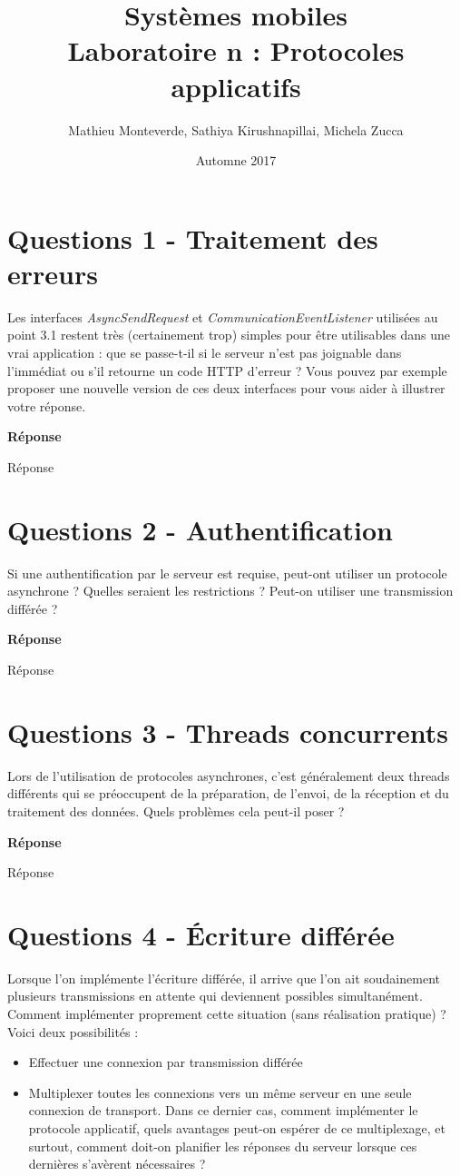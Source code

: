 \documentclass[francais,12pt]{article}
\title{Systèmes mobiles \\ Laboratoire n\textordmasculine2 : Protocoles applicatifs}
\author{Mathieu Monteverde, Sathiya Kirushnapillai, Michela Zucca}
\date{Automne 2017}
\begin{document}
	
	\maketitle
	
	\setlength{\parskip}{1em}
	
	\section*{Questions 1 - Traitement des erreurs}
	
	Les interfaces \textit{AsyncSendRequest} et \textit{CommunicationEventListener} utilisées au point 3.1 restent très (certainement trop) simples pour être utilisables dans une vrai application : que se passe-t-il si le serveur n'est pas joignable dans l'immédiat ou s'il retourne un code HTTP d'erreur ? Vous pouvez par exemple proposer une nouvelle version de ces deux interfaces pour vous aider à illustrer votre réponse.
	
	{\color[rgb]{0,0.5,0.23}\textbf{Réponse}}
	
	Réponse
	
	\section*{Questions 2 - Authentification}
	Si une authentification par le serveur est requise, peut-ont utiliser un protocole asynchrone ? Quelles seraient les restrictions ? Peut-on utiliser une transmission différée ?
	
	
	{\color[rgb]{0,0.5,0.23}\textbf{Réponse}}
	
	Réponse
	
	
	\section*{Questions 3 - Threads concurrents}
	Lors de l'utilisation de protocoles asynchrones, c'est généralement deux threads différents qui se préoccupent de la préparation, de l'envoi, de la réception et du traitement des données. Quels problèmes cela peut-il poser ?
	
	{\color[rgb]{0,0.5,0.23}\textbf{Réponse}}
	
	Réponse
	
	\section*{Questions 4 - Écriture différée}    
	Lorsque l'on implémente l'écriture différée, il arrive que l'on ait soudainement plusieurs transmissions en attente qui deviennent possibles simultanément. Comment implémenter proprement cette situation (sans réalisation pratique) ? Voici deux possibilités :
	\begin{itemize}
		\item Effectuer une connexion par transmission différée
		\item Multiplexer toutes les connexions vers un même serveur en une seule connexion de transport. Dans ce dernier cas, comment implémenter le protocole applicatif, quels avantages peut-on espérer de ce multiplexage, et surtout, comment doit-on planifier les réponses du serveur lorsque ces dernières s'avèrent nécessaires ?
	\end{itemize}
	
\end{document}
